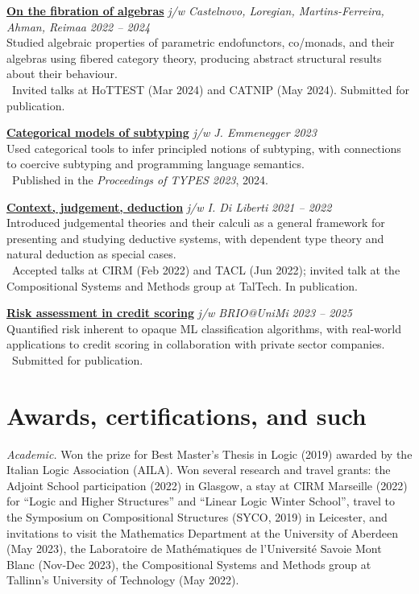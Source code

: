 \documentclass[a4paper,10pt]{article}
\begin{document}
\textbf{\href{https://arxiv.org/abs/2408.16581}{On the fibration of algebras}} \textit{j/w Castelnovo, Loregian, Martins-Ferreira, Ahman, Reimaa}  \hfill \textit{2022 -- 2024} \\
Studied algebraic properties of parametric endofunctors, co/monads, and their algebras using fibered category theory, producing abstract structural results about their behaviour. \\
\, Invited talks at HoTTEST (Mar 2024) and CATNIP (May 2024). Submitted for publication.


\textbf{\href{https://drops.dagstuhl.de/entities/document/10.4230/LIPIcs.TYPES.2023.3}{Categorical models of subtyping}} \textit{j/w J. Emmenegger} \hfill \textit{2023} \\
Used categorical tools to infer principled notions of subtyping, with connections to coercive subtyping and programming language semantics. \\
\, Published in the \emph{Proceedings of TYPES 2023}, 2024.

\textbf{\href{https://arxiv.org/abs/2111.09438}{Context, judgement, deduction}} \textit{j/w I. Di Liberti} \hfill \textit{2021 -- 2022} \\
Introduced judgemental theories and their calculi as a general framework for presenting and studying deductive systems, with dependent type theory and natural deduction as special cases. \\
\, Accepted talks at CIRM (Feb 2022) and TACL (Jun 2022); invited talk at the Compositional Systems and Methods group at TalTech. In publication.


\textbf{\href{https://arxiv.org/abs/2406.03292}{Risk assessment in credit scoring}} \textit{j/w BRIO@UniMi}  \hfill \textit{2023 -- 2025} \\
Quantified risk inherent to opaque ML classification algorithms, with real-world applications to credit scoring in collaboration with private sector companies. \\
\, Submitted for publication.

\section*{ Awards, certifications, and such}
\textit{Academic.} Won the prize for Best Master's Thesis in Logic (2019) awarded by the Italian Logic Association (AILA). Won several research and travel grants: the Adjoint School participation (2022) in Glasgow, a stay at CIRM Marseille (2022) for ``Logic and Higher Structures'' and ``Linear Logic Winter School'', travel to the Symposium on Compositional Structures (SYCO, 2019) in Leicester, and invitations to visit the Mathematics Department at the University of Aberdeen (May 2023), the Laboratoire de Mathématiques de l'Université Savoie Mont Blanc (Nov-Dec 2023), the Compositional Systems and Methods group at Tallinn's University of Technology (May 2022).
\end{document}
